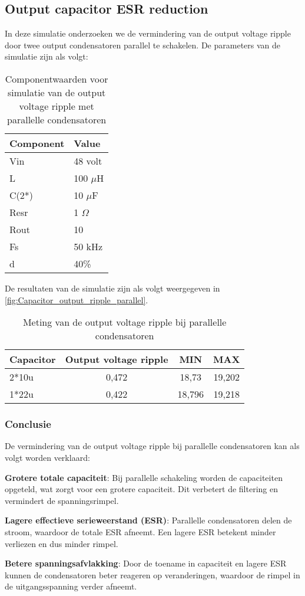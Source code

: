 \subsection{Output capacitor ESR reduction}
In deze simulatie onderzoeken we de vermindering van de output voltage ripple door twee output condensatoren parallel te schakelen. De parameters van de simulatie zijn als volgt:
\begin{table}[h!]
\centering
\begin{tabular}{|l|l|}
\hline
\textbf{Component} & \textbf{Value} \\
\hline
Vin  & 48 volt \\
L    & 100 $\mu$H \\
C(2*) & 10 $\mu$F \\
Resr & 1 $\Omega$ \\
Rout & 10 \\
Fs   & 50 kHz \\
d    & 40\% \\
\hline
\end{tabular}
\caption{Componentwaarden voor simulatie van de output voltage ripple met parallelle condensatoren}
\label{fig:Componentwaarden_parallel_condensatoren}
\end{table}

De resultaten van de simulatie zijn als volgt weergegeven in \autoref{fig:Capacitor_output_ripple_parallel}.
\begin{table}[h!]
\centering
\begin{tabular}{|l|c|c|c|}
\hline
\textbf{Capacitor} & \textbf{Output voltage ripple} & \textbf{MIN} & \textbf{MAX} \\
\hline
2*10u   & 0,472  & 18,73  & 19,202 \\
1*22u   & 0,422  & 18,796 & 19,218 \\
\hline
\end{tabular}
\caption{Meting van de output voltage ripple bij parallelle condensatoren}
\label{fig:Capacitor_output_ripple_parallel}
\end{table}

\subsubsection{Conclusie}
De vermindering van de output voltage ripple bij parallelle condensatoren kan als volgt worden verklaard:

\textbf{Grotere totale capaciteit}: Bij parallelle schakeling worden de capaciteiten opgeteld, wat zorgt voor een grotere capaciteit. Dit verbetert de filtering en vermindert de spanningsrimpel.

\textbf{Lagere effectieve serieweerstand (ESR)}: Parallelle condensatoren delen de stroom, waardoor de totale ESR afneemt. Een lagere ESR betekent minder verliezen en dus minder rimpel.

\textbf{Betere spanningsafvlakking}: Door de toename in capaciteit en lagere ESR kunnen de condensatoren beter reageren op veranderingen, waardoor de rimpel in de uitgangsspanning verder afneemt.